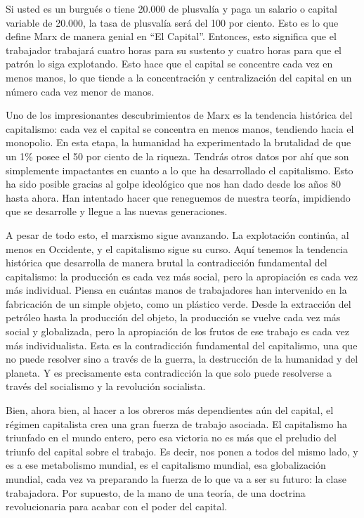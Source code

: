 \documentclass[
  a4paper,
]{article}
\begin{document}
Si usted es un burgués o tiene 20.000 de plusvalía y paga un salario o
capital variable de 20.000, la tasa de plusvalía será del 100 por
ciento. Esto es lo que define Marx de manera genial en ``El Capital''.
Entonces, esto significa que el trabajador trabajará cuatro horas para
su sustento y cuatro horas para que el patrón lo siga explotando. Esto
hace que el capital se concentre cada vez en menos manos, lo que tiende
a la concentración y centralización del capital en un número cada vez
menor de manos.

Uno de los impresionantes descubrimientos de Marx es la tendencia
histórica del capitalismo: cada vez el capital se concentra en menos
manos, tendiendo hacia el monopolio. En esta etapa, la humanidad ha
experimentado la brutalidad de que un 1\% posee el 50 por ciento de la
riqueza. Tendrás otros datos por ahí que son simplemente impactantes en
cuanto a lo que ha desarrollado el capitalismo. Esto ha sido posible
gracias al golpe ideológico que nos han dado desde los años 80 hasta
ahora. Han intentado hacer que reneguemos de nuestra teoría, impidiendo
que se desarrolle y llegue a las nuevas generaciones.

A pesar de todo esto, el marxismo sigue avanzando. La explotación
continúa, al menos en Occidente, y el capitalismo sigue su curso. Aquí
tenemos la tendencia histórica que desarrolla de manera brutal la
contradicción fundamental del capitalismo: la producción es cada vez más
social, pero la apropiación es cada vez más individual. Piensa en
cuántas manos de trabajadores han intervenido en la fabricación de un
simple objeto, como un plástico verde. Desde la extracción del petróleo
hasta la producción del objeto, la producción se vuelve cada vez más
social y globalizada, pero la apropiación de los frutos de ese trabajo
es cada vez más individualista. Esta es la contradicción fundamental del
capitalismo, una que no puede resolver sino a través de la guerra, la
destrucción de la humanidad y del planeta. Y es precisamente esta
contradicción la que solo puede resolverse a través del socialismo y la
revolución socialista.

Bien, ahora bien, al hacer a los obreros más dependientes aún del
capital, el régimen capitalista crea una gran fuerza de trabajo
asociada. El capitalismo ha triunfado en el mundo entero, pero esa
victoria no es más que el preludio del triunfo del capital sobre el
trabajo. Es decir, nos ponen a todos del mismo lado, y es a ese
metabolismo mundial, es el capitalismo mundial, esa globalización
mundial, cada vez va preparando la fuerza de lo que va a ser su futuro:
la clase trabajadora. Por supuesto, de la mano de una teoría, de una
doctrina revolucionaria para acabar con el poder del capital.
\end{document}
